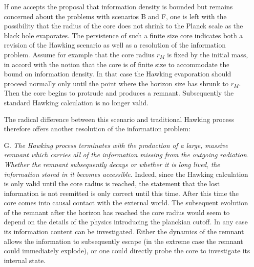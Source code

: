 \itemskip
If one accepts the proposal that information density is bounded but remains
concerned about the problems with scenarios B and F, one is left with the
possibility that the radius of the core does not shrink to the Planck scale
as the black hole evaporates.  The persistence of such a finite size core
indicates both a revision of the Hawking scenario as well as a
resolution of the information problem.  Assume for example that the core
radius $r_M$
is fixed by the initial mass, in accord with the notion that the
core is of finite size to accommodate the bound on information
density.  In that case the Hawking evaporation should proceed
normally only until the point where the horizon size has shrunk to
$r_M$.  Then the core begins to protrude and produces a remnant.
Subsequently the standard
Hawking
calculation is no longer valid.

The radical difference between this scenario and traditional Hawking
process therefore
offers another resolution of the information problem:
\itemskip
\item{G.} {\it The Hawking process terminates with the production of a
large, massive remnant which carries all of the  information
missing from the outgoing radiation.  Whether the remnant subsequently
decays or whether it is long lived, the information stored in it becomes
accessible.}
\itemskip
Indeed,
since the
Hawking calculation is only valid until the core radius is reached,
the statement that the lost information is not reemitted is only
correct until this time.  After this time the core comes into causal
contact with the external world.  The subsequent evolution
of the remnant after the horizon has reached
the core radius would seem to depend on the details of the physics
introducing the planckian cutoff.  In any case its information
content can be investigated.  Either the dynamics of the remnant allows
the information to subsequently escape (in the extreme case the remnant
could immediately explode), or one could
directly probe the core to investigate its internal state.

